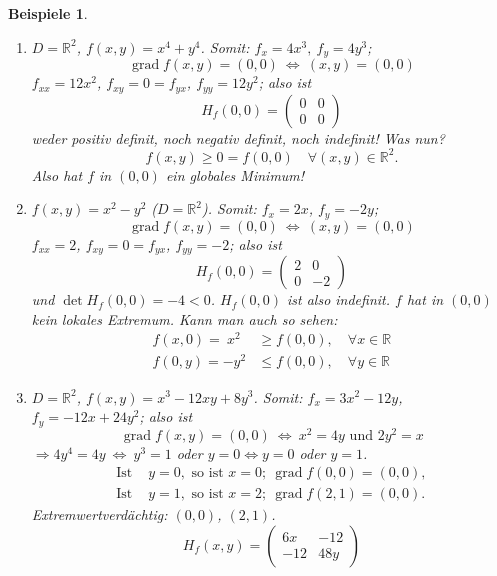 \documentclass[12pt]{extreport} %
\newcommand{\R}{\mathbb{R}}
\theoremstyle{named}
\theoremstyle{nnamed}
\theoremstyle{itshape}
\theoremstyle{normal}
\newtheorem*{beispiele}{Beispiele}
\begin{document}
\begin{beispiele} ~\
	\begin{enumerate}
		\item $D = \R^{2}$, $f(x, y) = x^{4} + y^{4}$. Somit: $f_{x} = 4x^{3}, ~ f_{y} = 4 y^{3}$;
			$$ \operatorname{grad}f(x, y) = (0, 0) ~ \iff ~ (x, y) = (0, 0) $$
			$f_{xx} = 12 x^{2}$, $f_{xy} = 0 = f_{yx}$, $f_{yy} = 12 y^{2}$; also ist
			$$ H_{f}(0, 0) = \begin{pmatrix} 0 & 0 \\ 0 & 0 \end{pmatrix} $$
			weder positiv definit, noch negativ definit, noch indefinit! Was nun?
			$$ f(x, y) \geq 0 = f(0, 0) \quad \forall (x, y) \in \R^{2}. $$
			Also hat $f$ in $(0, 0)$ ein globales Minimum!
		\item $f(x, y) = x^{2} - y^{2}$ ($D = \R^{2}$). Somit: $f_{x} = 2x$, $f_{y} = - 2y$;
			$$ \operatorname{grad} f(x, y) = (0, 0) ~\iff~(x, y) = (0, 0) $$
			$f_{xx} = 2$, $f_{xy} = 0 = f_{yx}$, $f_{yy} = -2$; also ist
			$$ H_{f}(0, 0) = \begin{pmatrix} 2 & 0 \\ 0 & -2 \end{pmatrix} $$
			und $\det H_{f}(0, 0) = -4 < 0$. $H_{f}(0, 0)$ ist also indefinit. $f$ hat in $(0, 0)$ kein lokales Extremum. Kann man auch so sehen:
			\begin{align*}
				f(x, 0) =  ~ x^{2} ~ & \geq f(0, 0), \quad \forall x \in \R \\
				f(0, y) = - y^{2} & \leq f(0, 0), \quad \forall y \in \R 
			\end{align*}
		\item $D = \R^{2}$, $f(x, y) = x^{3} - 12 xy + 8 y^{3}$. Somit: $f_{x} = 3 x^{2} - 12 y$, $f_{y} = -12x + 24y^{2}$; also ist
			$$ \operatorname{grad} f(x, y) = (0, 0) ~ \iff ~ x^{2} = 4y \text{ und } 2y^{2} = x $$
			$\Rightarrow 4y^{4} = 4y ~\iff~ y^{3} = 1$ oder $y = 0 \iff y = 0$ oder $y = 1$. 
			\begin{align*}
				\text{Ist } & y = 0, \text{ so ist } x = 0; ~ \operatorname{grad} f(0, 0) = (0, 0), \\
				\text{Ist } & y = 1, \text{ so ist } x = 2; ~ \operatorname{grad} f(2, 1) = (0, 0).
			\end{align*}
			Extremwertverdächtig: $(0, 0)$, $(2, 1)$.
			$$ H_{f}(x, y) = \begin{pmatrix} 6x & -12 \\ -12 & 48y \end{pmatrix} $$
			  \begin{itemize}

\end{itemize}
\end{enumerate}
\end{beispiele}
\end{document}
